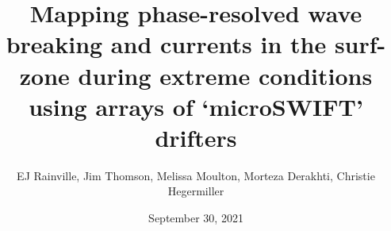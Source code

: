 \documentclass{article}
\begin{document}
\title{Mapping phase-resolved wave breaking and currents in the surf-zone during extreme conditions using arrays of ‘microSWIFT’ drifters}
\author{EJ Rainville, Jim Thomson, Melissa Moulton, Morteza Derakhti, Christie Hegermiller	}
\date{September 30, 2021}
\maketitle












\end{document}
